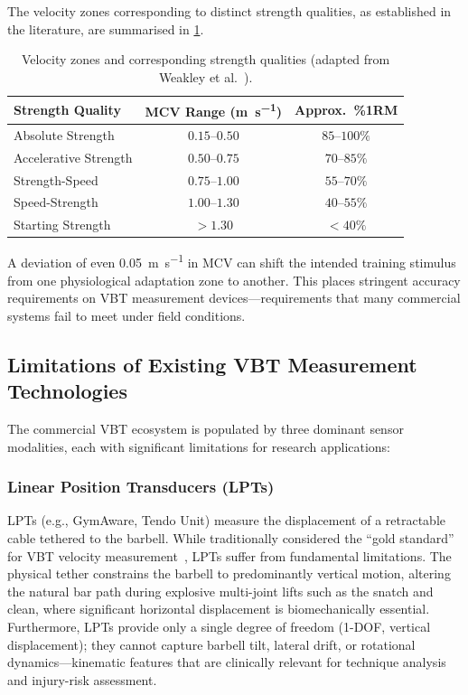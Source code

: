 The velocity zones corresponding to distinct strength qualities, as established in the literature, are summarised in \cref{tab:vel_zones}.

\begin{table}[H]
  \centering
  \caption{Velocity zones and corresponding strength qualities (adapted from Weakley et al.~\cite{weakley2021}).}
  \label{tab:vel_zones}
  \begin{tabular}{lcc}
    \toprule
    \textbf{Strength Quality} & \textbf{MCV Range (\si{\metre\per\second})} & \textbf{Approx.\ \%1RM} \\
    \midrule
    Absolute Strength    & $0.15$--$0.50$ & $85$--$100\%$ \\
    Accelerative Strength & $0.50$--$0.75$ & $70$--$85\%$  \\
    Strength-Speed       & $0.75$--$1.00$ & $55$--$70\%$  \\
    Speed-Strength       & $1.00$--$1.30$ & $40$--$55\%$  \\
    Starting Strength    & $> 1.30$       & $< 40\%$      \\
    \bottomrule
  \end{tabular}
\end{table}

A deviation of even \SI{0.05}{\metre\per\second} in MCV can shift the intended training stimulus from one physiological adaptation zone to another.
This places stringent accuracy requirements on VBT measurement devices---requirements that many commercial systems fail to meet under field conditions.


\subsection{Limitations of Existing VBT Measurement Technologies}\label{sec:limitations}

The commercial VBT ecosystem is populated by three dominant sensor modalities, each with significant limitations for research applications:

\subsubsection{Linear Position Transducers (LPTs)}
LPTs (e.g., GymAware, Tendo Unit) measure the displacement of a retractable cable tethered to the barbell.
While traditionally considered the ``gold standard'' for VBT velocity measurement~\cite{banyard2017}, LPTs suffer from fundamental limitations.
The physical tether constrains the barbell to predominantly vertical motion, altering the natural bar path during explosive multi-joint lifts such as the snatch and clean, where significant horizontal displacement is biomechanically essential.
Furthermore, LPTs provide only a single degree of freedom (1-DOF, vertical displacement); they cannot capture barbell tilt, lateral drift, or rotational dynamics---kinematic features that are clinically relevant for technique analysis and injury-risk assessment.


